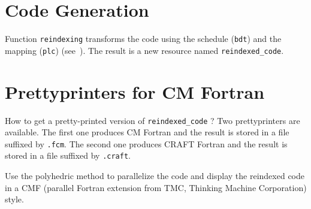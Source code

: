 \documentclass[a4paper]{report}
\newenvironment{PipsMake}{\begin{alltt}}{\end{alltt}}
\begin{document}



\section{Code Generation}

Function \texttt{reindexing} transforms the code using the schedule
(\texttt{bdt}) and the mapping (\texttt{plc}) (see~\cite{Col93,Pla95a}). The
result is a new resource named \verb/reindexed_code/.


\section{Prettyprinters for CM Fortran}

How to get a pretty-printed version of \verb+reindexed_code+ ? Two
prettyprinters are available. The first one produces CM Fortran and the
result is stored in a file suffixed by \verb+.fcm+. The second one
produces CRAFT Fortran and the result is stored in a file suffixed by
\verb+.craft+.


Use the polyhedric method to parallelize the code and display the
reindexed code in a CMF (parallel Fortran extension from TMC, Thinking
Machine Corporation) style.

\end{document}
